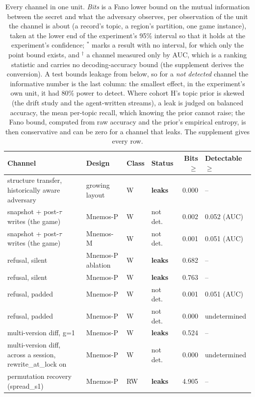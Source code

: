 \begin{table}[t]
\centering
\caption{Every channel in one unit. \emph{Bits} is a Fano lower bound on the mutual information between the secret and what the adversary observes, per observation of the unit the channel is about (a record's topic, a region's partition, one game instance), taken at the lower end of the experiment's 95\% interval so that it holds at the experiment's confidence; $^\ast$ marks a result with no interval, for which only the point bound exists, and $^\dagger$ a channel measured only by AUC, which is a ranking statistic and carries no decoding-accuracy bound (the supplement derives the conversion). A test bounds leakage from below, so for a \emph{not detected} channel the informative number is the last column: the smallest effect, in the experiment's own unit, it had 80\% power to detect. Where cohort H's topic prior is skewed (the drift study and the agent-written streams), a leak is judged on balanced accuracy, the mean per-topic recall, which knowing the prior cannot raise; the Fano bound, computed from raw accuracy and the prior's empirical entropy, is then conservative and can be zero for a channel that leaks. The supplement gives every row.}
\label{tab:ledger}
\footnotesize
\setlength{\tabcolsep}{4pt}
\begin{tabular}{llllrl}
\toprule
Channel & Design & Class & Status & Bits $\geq$ & Detectable $\geq$ \\
\midrule
structure transfer, historically aware adversary & growing layout & W & \textbf{leaks} & 0.000 & -- \\
snapshot + post-$\tau$ writes (the game) & Mnemos-P & W & not det. & 0.002 & 0.052 (AUC) \\
snapshot + post-$\tau$ writes (the game) & Mnemos-M & W & not det. & 0.001 & 0.051 (AUC) \\
refusal, silent & Mnemos-P ablation & W & \textbf{leaks} & 0.682 & -- \\
refusal, silent & Mnemos-P & W & \textbf{leaks} & 0.763 & -- \\
refusal, padded & Mnemos-P & W & not det. & 0.001 & 0.051 (AUC) \\
refusal, padded & Mnemos-P & W & not det. & 0.000 & undetermined \\
multi-version diff, g=1 & Mnemos-P & W & \textbf{leaks} & 0.524 & -- \\
multi-version diff, across a session, rewrite\_at\_lock on & Mnemos-P & W & not det. & 0.000 & undetermined \\
permutation recovery (spread\_s1) & Mnemos-P & RW & \textbf{leaks} & 4.905 & -- \\

\end{tabular}
\end{table}
